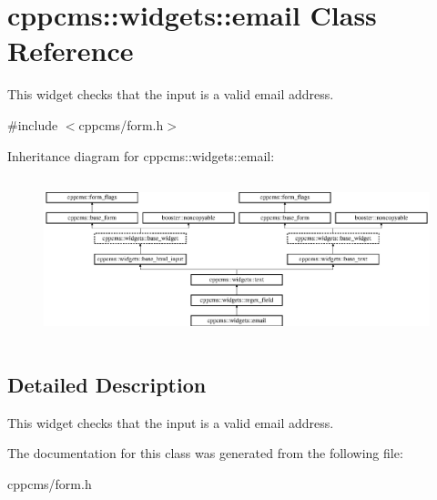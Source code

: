 \section{cppcms\-:\-:widgets\-:\-:email \-Class \-Reference}
\label{classcppcms_1_1widgets_1_1email}


\-This widget checks that the input is a valid email address.  




{\ttfamily \#include $<$cppcms/form.\-h$>$}

\-Inheritance diagram for cppcms\-:\-:widgets\-:\-:email\-:\begin{figure}[H]
\begin{center}
\leavevmode
\includegraphics[height=4.734299cm]{classcppcms_1_1widgets_1_1email}
\end{center}
\end{figure}


\subsection{\-Detailed \-Description}
\-This widget checks that the input is a valid email address. 

\-The documentation for this class was generated from the following file\-:\begin{DoxyCompactItemize}
\item 
cppcms/form.\-h\end{DoxyCompactItemize}
